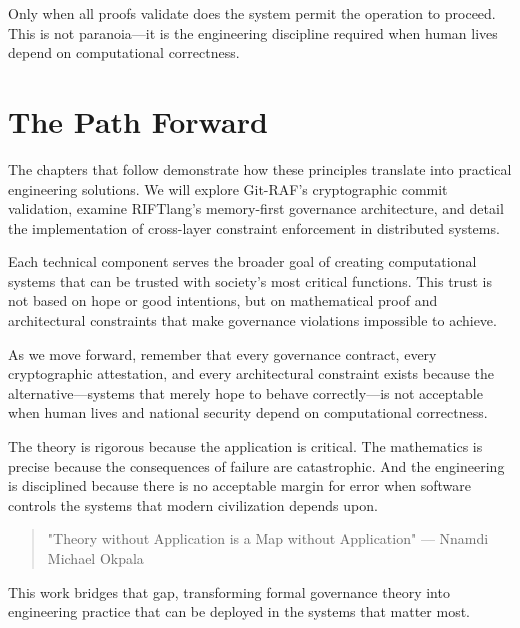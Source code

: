 Only when all proofs validate does the system permit the operation to proceed. This is not paranoia—it is the engineering discipline required when human lives depend on computational correctness.

\section*{The Path Forward}

The chapters that follow demonstrate how these principles translate into practical engineering solutions. We will explore Git-RAF's cryptographic commit validation, examine RIFTlang's memory-first governance architecture, and detail the implementation of cross-layer constraint enforcement in distributed systems.

Each technical component serves the broader goal of creating computational systems that can be trusted with society's most critical functions. This trust is not based on hope or good intentions, but on mathematical proof and architectural constraints that make governance violations impossible to achieve.

As we move forward, remember that every governance contract, every cryptographic attestation, and every architectural constraint exists because the alternative—systems that merely hope to behave correctly—is not acceptable when human lives and national security depend on computational correctness.

The theory is rigorous because the application is critical. The mathematics is precise because the consequences of failure are catastrophic. And the engineering is disciplined because there is no acceptable margin for error when software controls the systems that modern civilization depends upon.

\begin{quote}
"Theory without Application is a Map without Application"
\hfill--- Nnamdi Michael Okpala
\end{quote}

This work bridges that gap, transforming formal governance theory into engineering practice that can be deployed in the systems that matter most.